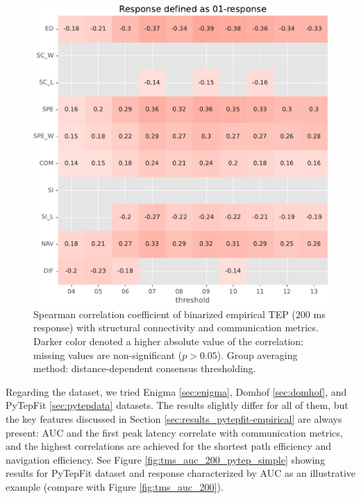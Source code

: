 \begin{figure}
    \centering
    \includegraphics[width=\textwidth]{images/nootebook_generated/tmseeg_results/empirical/200/not_over_threshold_nan/Mica-Mics_dist/Response defined as 01-response.pdf}
    \caption[Binarized TEP (200 ms) correlations (dist)]{Spearman correlation coefficient of binarized empirical TEP (200 ms response) with structural connectivity and communication metrics. Darker color denoted a higher absolute value of the correlation; missing values are non-significant ($p>0.05$). Group averaging method: distance-dependent consensus thresholding.}
    \label{fig:tms_01_200_dist}
\end{figure}

Regarding the dataset, we tried Enigma \ref{sec:enigma}, Domhof \ref{sec:domhof}, and PyTepFit \ref{sec:pytepdata} datasets. The results slightly differ for all of them, but the key features discussed in Section \ref{sec:results_pytepfit-empirical} are always present: AUC and the first peak latency correlate with communication metrics, and the highest correlations are achieved for the shortest path efficiency and navigation efficiency. See Figure \ref{fig:tms_auc_200_pytep_simple} showing results for PyTepFit dataset and response characterized by AUC as an illustrative example (compare with Figure \ref{fig:tms_auc_200}).


